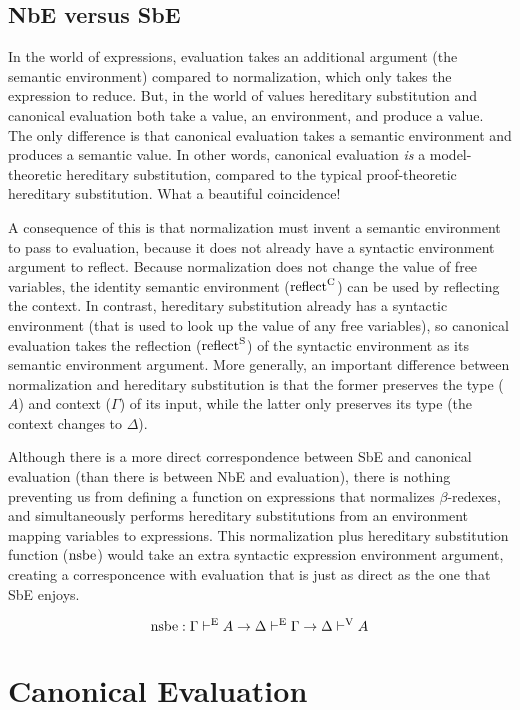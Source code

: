 \documentclass{llncs}
\def\marr{\rightarrow}
\def\reflecte{\fun{reflect}^\con{S}}
\def\reflectc{\fun{reflect}^\con{C}}
\def\nsbe{\fun{nsbe}}
\newcommand{\turn}[1]{\vdash^\con{#1}}
\newcommand{\con}[1]{\textmd{#1}}
\newcommand{\fun}[1]{\textmd{#1}}
\newcommand{\type}[1]{\Gamma \turn{E} #1}
\newcommand{\dtypv}[1]{\Delta \turn{V} #1}
\def\enve{\Delta \turn{E} \Gamma}
\begin{document}
\subsection{NbE versus SbE}

In the world of expressions,
evaluation takes an additional argument (the semantic environment) compared
to normalization, which only takes the expression to reduce. But, in
the world of values hereditary substitution and canonical evaluation
both take a value, an environment, and produce a value. The only
difference is that canonical evaluation takes a semantic environment and
produces a semantic value. 
In other words, canonical evaluation \textit{is}
a model-theoretic hereditary substitution, compared to the typical
proof-theoretic hereditary substitution.
What a beautiful coincidence!

A consequence of this is that normalization must invent a semantic
environment to pass to evaluation, because it does not already
have a syntactic environment argument to reflect. Because normalization does not
change the value of free variables, the identity semantic environment
($\reflectc$) can be used by reflecting the context. In contrast, hereditary substitution already has
a syntactic environment (that is used to look up the value of any free
variables), so canonical evaluation takes the 
reflection ($\reflecte$) of the syntactic environment as its semantic
environment argument. More generally, an important difference between
normalization and hereditary substitution is that the former preserves
the type ($A$) and context ($\Gamma$) of its input, while the latter
only preserves its type (the context changes to $\Delta$).

Although there is a more direct correspondence between SbE and canonical
evaluation (than there is between NbE and evaluation), there is
nothing preventing us from defining a function on expressions that
normalizes $\beta$-redexes, and simultaneously performs hereditary
substitutions from an environment mapping variables to expressions.
This normalization plus hereditary substitution function ($\nsbe$) would take an
extra syntactic expression environment argument, creating a
corresponcence with evaluation that is just as direct as the one that
SbE enjoys.

$$
\nsbe : \type{A} \marr \enve \marr \dtypv{A}
$$


\section{Canonical Evaluation}
\label{sec:ceval}
\end{document}
